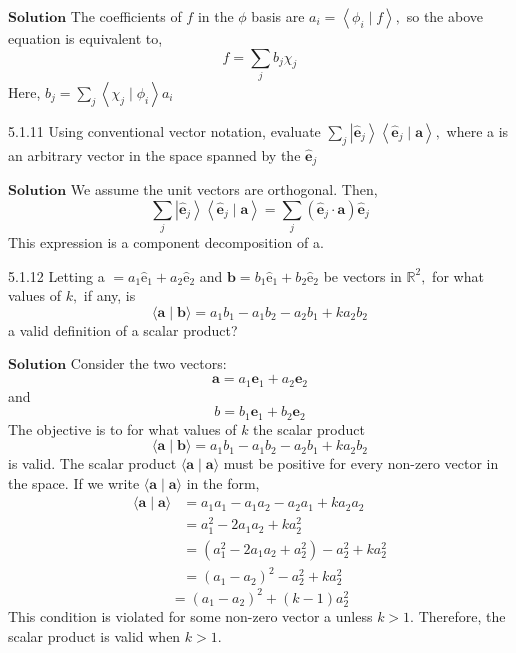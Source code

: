 \documentclass{article}
\begin{document}
\begin{flushleft}
$\boxed{\textbf{Solution}}$ The coefficients of $f$ in the $\phi$ basis are $a_{i}=\left\langle\phi_{i} \mid f\right\rangle,$ so the above equation is equivalent to,
$$
f=\sum_{j} b_{j} \chi_{j}
$$
Here, $b_{j}=\sum_{j}\left\langle\chi_{j} \mid \phi_{i}\right\rangle a_{i}$

\newpage

\begin{mybox}{5.1.11}
Using conventional vector notation, evaluate $\sum_{j}\left|\hat{\mathbf{e}}_{j}\right\rangle\left\langle\hat{\mathbf{e}}_{j} \mid \mathbf{a}\right\rangle,$ where a is an arbitrary vector in the space spanned by the $\hat{\mathbf{e}}_{j}$
\end{mybox}

$\boxed{\textbf{Solution}}$  We assume the unit vectors are orthogonal. Then,
$$
\sum_{j}\left|\hat{\mathbf{e}}_{j}\right\rangle\left\langle\hat{\mathbf{e}}_{j} \mid \mathbf{a}\right\rangle=\sum_{j}\left(\hat{\mathbf{e}}_{j} \cdot \mathbf{a}\right) \hat{\mathbf{e}}_{j}
$$
This expression is a component decomposition of a.

\newpage

\begin{mybox}{5.1.12}
Letting a $=a_{1} \hat{\mathrm{e}}_{1}+a_{2} \hat{\mathrm{e}}_{2}$ and $\mathbf{b}=b_{1} \hat{\mathrm{e}}_{1}+b_{2} \hat{\mathrm{e}}_{2}$ be vectors in $\mathbb{R}^{2},$ for what values of $k,$ if
any, is
$$
\langle\mathbf{a} \mid \mathbf{b}\rangle=a_{1} b_{1}-a_{1} b_{2}-a_{2} b_{1}+k a_{2} b_{2}
$$
a valid definition of a scalar product?
\end{mybox}

$\boxed{\textbf{Solution}}$ Consider the two vectors:
$$\mathbf{a}=a_{1} \mathbf{e}_{1}+a_{2} \mathbf{e}_{2}$$ 
and 
$$b=b_{1} \mathbf{e}_{1}+b_{2} \mathbf{e}_{2}$$
The objective is to for what values of $k$ the scalar product 
$$\langle\mathbf{a} \mid \mathbf{b}\rangle=a_{1} b_{1}-a_{1} b_{2}-a_{2} b_{1}+k a_{2} b_{2}$$
is valid. The scalar product $\langle\mathbf{a} \mid \mathbf{a}\rangle$ must be positive for every non-zero vector in the space. If we write
$\langle\mathbf{a} \mid \mathbf{a}\rangle$ in the form,
$$
\begin{aligned}
\langle\mathbf{a} \mid \mathbf{a}\rangle &=a_{1} a_{1}-a_{1} a_{2}-a_{2} a_{1}+k a_{2} a_{2} \\
&=a_{1}^{2}-2 a_{1} a_{2}+k a_{2}^{2} \\
&=\left(a_{1}^{2}-2 a_{1} a_{2}+a_{2}^{2}\right)-a_{2}^{2}+k a_{2}^{2} \\
&=\left(a_{1}-a_{2}\right)^{2}-a_{2}^{2}+k a_{2}^{2}
\end{aligned}
$$
$$
=\left(a_{1}-a_{2}\right)^{2}+(k-1) a_{2}^{2}
$$
This condition is violated for some non-zero vector a unless $k>1$.
Therefore, the scalar product is valid when $k>1$.






\end{flushleft}
\end{document}
